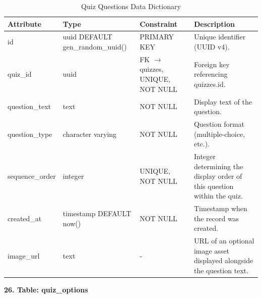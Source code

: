 \documentclass[12pt, oneside]{article} %
\newcommand{\tabbreak}{\hyphenpenalty=200\exhyphenpenalty=200\tolerance=4000\hbadness=10000\hspace{0pt}}
\begin{document}
\begin{table}[H]
\caption{Quiz Questions Data Dictionary}
\label{tab:dd_quiz_questions}
\vspace{-4mm}
\begin{center}
\renewcommand{\arraystretch}{1.15}
\scriptsize
\begin{tabular}{|>{\raggedright\arraybackslash\tabbreak}p{2.67cm}|>{\raggedright\arraybackslash\tabbreak}p{2.93cm}|>{\raggedright\arraybackslash\tabbreak}p{2.67cm}|>{\raggedright\arraybackslash\tabbreak}p{4.51cm}|}
\hline
\textbf{Attribute} & \textbf{Type} & \textbf{Constraint} & \textbf{Description} \\ \hline
id & uuid DEFAULT gen\_random\_uuid() & PRIMARY KEY & Unique identifier (UUID v4). \\ \hline
quiz\_id & uuid & FK $\rightarrow$ quizzes, UNIQUE, NOT NULL & Foreign key referencing quizzes.id. \\ \hline
question\_text & text & NOT NULL & Display text of the question. \\ \hline
question\_type & character varying & NOT NULL & Question format (multiple-choice, etc.). \\ \hline
sequence\_order & integer & UNIQUE, NOT NULL & Integer determining the display order of this question within the quiz. \\ \hline
created\_at & timestamp DEFAULT now() & NOT NULL & Timestamp when the record was created. \\ \hline
image\_url & text & - & URL of an optional image asset displayed alongside the question text. \\ \hline
\end{tabular}
\end{center}
\end{table}

\textbf{26. Table: quiz\_options}
\end{document}
